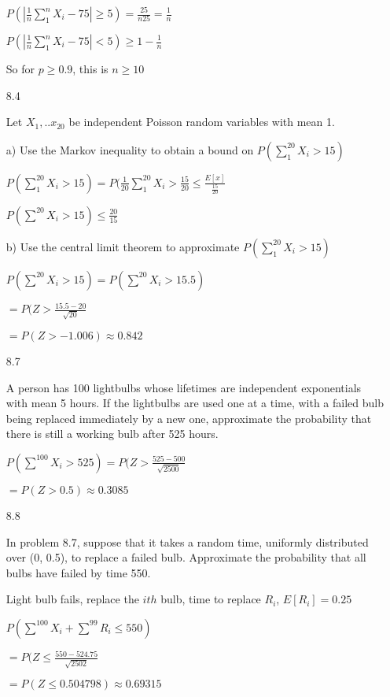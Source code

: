 \documentclass[11pt]{article}
\begin{document}
\begin{itemize}
		$P(|\frac{1}{n}\sum_{1}^{n} X_i - 75| \geq 5) =
		\frac{25}{n25} = \frac{1}{n}$

		$P(|\frac{1}{n}\sum_{1}^{n} X_i - 75| < 5) \geq
		1 - \frac{1}{n}$

		So for $p \geq 0.9$, this is $n \geq 10$

	\item[8.4]
		
		Let $X_1, ..x_{20}$ be independent Poisson random 
		variables with mean 1.

		a) Use the Markov inequality to obtain a bound on
		$P(\sum_{1}^{20} X_i > 15)$

		$P(\sum_1^{20} X_i > 15) = P(\frac{1}{20}\sum_{1}^{20}X_i
		> \frac{15}{20} \leq \frac{E[x]}{\frac{15}{20}}$

		$P(\sum^{20} X_i > 15) \leq \frac{20}{15}$

		b) Use the central limit theorem to approximate
		$P(\sum_1^{20} X_i > 15)$

		$P(\sum^{20} X_i > 15) = P(\sum^{20} X_i > 15.5)$

		$=P(Z > \frac{15.5-20}{\sqrt{20}}$

		$=P(Z > -1.006) \approx 0.842$

	\item[8.7]

		A person has 100 lightbulbs whose lifetimes are 
		independent exponentials with mean 5 hours.
		If the lightbulbs are used one at a time, with
		a failed bulb being replaced immediately by a new one,
		approximate the probability that there is still a
		working bulb after 525 hours.

		$P(\sum^{100} X_i > 525) = P(Z > \frac{525-500}{
			\sqrt{2500}}$

		$= P(Z > 0.5) \approx 0.3085$

	\item[8.8]

		In problem 8.7, suppose that it takes a random time,
		uniformly distributed over (0, 0.5), to replace a 
		failed bulb. Approximate the probability that all bulbs
		have failed by time 550.

		Light bulb fails, replace the $ith$ bulb, time to replace $R_i$, $E[R_i] = 0.25$

		$P(\sum^{100} X_i + \sum^{99} R_i \leq 550)$

		$=P(Z \leq \frac{550-524.75}{\sqrt{2502}}$

		$=P(Z \leq 0.504798) \approx 0.69315$

\end{itemize}
\end{document}
